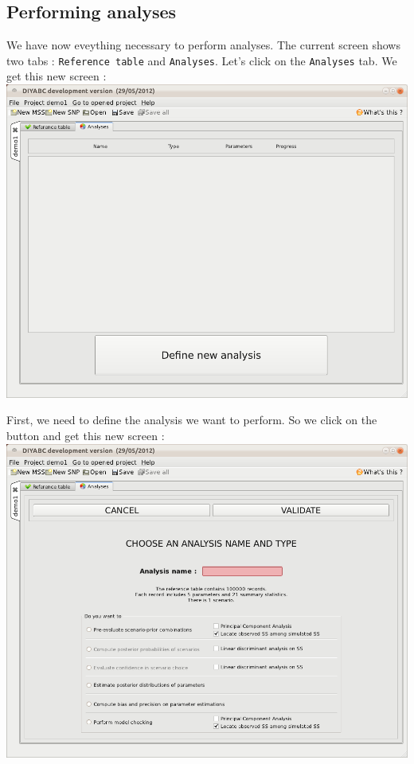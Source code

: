 \subsection{Performing analyses}

We have now eveything necessary to perform analyses. The current screen
shows two tabs : \texttt{Reference table} and \texttt{Analyses}. Let's
click on the \texttt{Analyses} tab. We get this new screen :\\


\includegraphics[scale=0.35]{gui_pictures/Capture-DIYABC-27}

First, we need to define the analysis we want to perform. So we click
on the  button and get this new
screen :\\


\includegraphics[scale=0.35]{gui_pictures/Capture-DIYABC-28}

